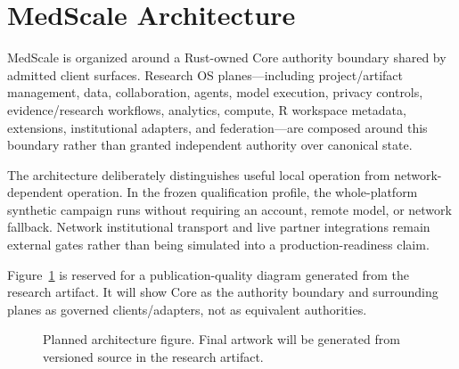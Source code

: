 \section{MedScale Architecture}

MedScale is organized around a Rust-owned Core authority boundary shared by admitted client surfaces. Research OS planes---including project/artifact management, data, collaboration, agents, model execution, privacy controls, evidence/research workflows, analytics, compute, R workspace metadata, extensions, institutional adapters, and federation---are composed around this boundary rather than granted independent authority over canonical state.

The architecture deliberately distinguishes useful local operation from network-dependent operation. In the frozen qualification profile, the whole-platform synthetic campaign runs without requiring an account, remote model, or network fallback. Network institutional transport and live partner integrations remain external gates rather than being simulated into a production-readiness claim.

Figure~\ref{fig:architecture} is reserved for a publication-quality diagram generated from the research artifact. It will show Core as the authority boundary and surrounding planes as governed clients/adapters, not as equivalent authorities.

\begin{figure}[ht]
  \centering
  \caption{Planned architecture figure. Final artwork will be generated from versioned source in the research artifact.}
  \label{fig:architecture}
\end{figure}
